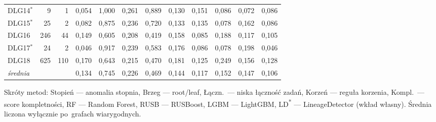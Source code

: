 \begin{table}[ht]
\begin{tabular}{lrrccccccccc}
DLG14$^{*}$ & 9 & 1 & 0{,}054 & 1{,}000 & 0{,}261 & 0{,}889 & 0{,}130 & 0{,}151 & 0{,}086 & 0{,}072 & 0{,}086 \\
DLG15$^{*}$ & 25 & 2 & 0{,}082 & 0{,}875 & 0{,}236 & 0{,}720 & 0{,}133 & 0{,}135 & 0{,}078 & 0{,}162 & 0{,}086 \\
DLG16 & 246 & 44 & 0{,}149 & 0{,}605 & 0{,}208 & 0{,}419 & 0{,}158 & 0{,}085 & 0{,}188 & 0{,}117 & 0{,}105 \\
DLG17$^{*}$ & 24 & 2 & 0{,}046 & 0{,}917 & 0{,}239 & 0{,}583 & 0{,}176 & 0{,}086 & 0{,}078 & 0{,}198 & 0{,}046 \\
DLG18 & 625 & 110 & 0{,}170 & 0{,}643 & 0{,}215 & 0{,}470 & 0{,}181 & 0{,}125 & 0{,}249 & 0{,}156 & 0{,}128 \\
\midrule
\emph{średnia} & & & 0{,}134 & 0{,}745 & 0{,}226 & 0{,}469 & 0{,}144 & 0{,}117 & 0{,}152 & 0{,}147 & 0{,}106 \\
\bottomrule
\end{tabular}

\vspace{0.4em}
\footnotesize Skróty metod: Stopień — anomalia stopnia, Brzeg — root/leaf, Łączn.\ — niska łączność zadań, Korzeń — reguła korzenia, Kompl.\ — score kompletności, RF — Random Forest, RUSB — RUSBoost, LGBM — LightGBM, LD\textsuperscript{*} — LineageDetector (wkład własny). Średnia liczona wyłącznie po~grafach wiarygodnych.
\end{table}